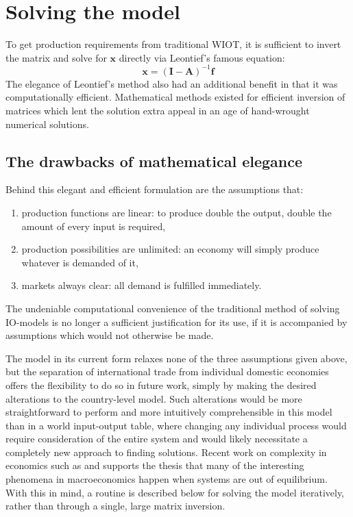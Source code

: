 \documentclass[a4paper]{article}
\begin{document}
\section{Solving the model}\label{sec:algorithm}
To get production requirements from traditional WIOT, it is sufficient to invert the matrix and solve for $\boldsymbol{x}$ directly via Leontief's famous equation:
\begin{equation}
\boldsymbol{x} = (\boldsymbol{I}- \boldsymbol{A})^{-1}\boldsymbol{f}
\end{equation}
The elegance of Leontief's method also had an additional benefit in that it was computationally efficient.
Mathematical methods existed for efficient inversion of matrices which lent the solution extra appeal in an age of hand-wrought numerical solutions.

\subsection{The drawbacks of mathematical elegance}
Behind this elegant and efficient formulation are the assumptions that:
\begin{enumerate}[i]
\itemsep 0em
\item production functions are linear: to produce double the output, double the amount of every input is required,
\item production possibilities are unlimited: an economy will simply produce whatever is demanded of it,
\item markets always clear: all demand is fulfilled immediately.
\end{enumerate}
The undeniable computational convenience of the traditional method of solving IO-models is no longer a sufficient justification for its use, if it is accompanied by assumptions which would not otherwise be made.

The model in its current form relaxes none of the three assumptions given above, but the separation of international trade from individual domestic economies offers the flexibility to do so in future work, simply by making the desired alterations to the country-level model.
Such alterations would be more straightforward to perform and more intuitively comprehensible in this model than in a world input-output table, where changing any individual process would require consideration of the entire system and would likely necessitate a completely new approach to finding solutions.
Recent work on complexity in economics such as \textcite{beinhocker_origin_2006} and \textcite{ramalingam_exploring_2009} supports the thesis that many of the interesting phenomena in macroeconomics happen when systems are out of equilibrium.
With this in mind, a routine is described below for solving the model iteratively, rather than through a single, large matrix inversion.
\end{document}
